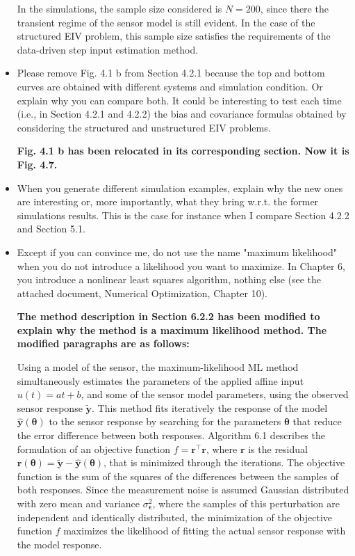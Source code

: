 \documentclass[11pt]{article}
\begin{document}
\begin{itemize}
    In the simulations, the sample size considered is $N=200$, since there the transient regime of the sensor model is still evident. 
    In the case of the structured EIV problem, this sample size satisfies the requirements of the data-driven step input estimation method. 
    \color{black}

    
    \item Please remove Fig. 4.1 b from Section 4.2.1 because the top and bottom curves are obtained with different systems and simulation condition. Or explain why you can compare both. It could be interesting to test each time (i.e., in Section 4.2.1 and 4.2.2) the bias and covariance formulas obtained by considering the structured and unstructured EIV problems. 
    
    {\bfseries Fig. 4.1 b has been relocated in its corresponding section. Now it is Fig. 4.7.}
    
    \item  When you generate different simulation examples, explain why the new ones are interesting or, more importantly, what they bring w.r.t. the former simulations results. This is the case for instance when I compare Section 4.2.2 and Section 5.1. 
    \item Except if you can convince me, do not use the name "maximum likelihood" when you do not introduce a likelihood you want to maximize. In Chapter 6, you introduce a nonlinear least squares algorithm, nothing else (see the attached document, Numerical Optimization, Chapter 10).
    
    {\bfseries The method description in Section 6.2.2 has been modified to explain why the method is a maximum likelihood method. The modified paragraphs are as follows: }
    
    \color{blue} 
    Using a model of the sensor, the maximum-likelihood ML method simultaneously estimates the parameters of the applied affine input $u(t) = at + b$, and some of the sensor model parameters, using the observed sensor response $\widetilde{\mathbf{y}}$.
    This method fits iteratively the response of the model $\widehat{\mathbf{y}}(\bm{\theta})$ to the sensor response by searching for the parameters $\bm{\theta}$ that reduce the error difference between both responses.
    Algorithm 6.1 describes the formulation of an objective function $f = \mathbf{r}^\top \mathbf{r}$, where $\mathbf{r}$ is the residual $\mathbf{r}(\bm{\theta}) = \widetilde{\mathbf{y}} - \widehat{\mathbf{y}}(\bm{\theta})$, that is minimized through the iterations.
    The objective function is the sum of the squares of the differences between the samples of both responses.
    Since the measurement noise is assumed Gaussian distributed with zero mean and variance $\sigma_{\bm{\epsilon}}^2$, where the samples of this perturbation are independent and identically distributed, the minimization of the objective function $f$ maximizes the likelihood of fitting the actual sensor response with the model response.



\end{itemize}
\end{document}
